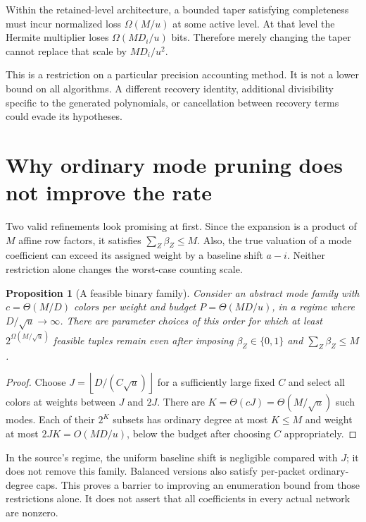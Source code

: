 \documentclass[11pt,letterpaper]{article}
\numberwithin{equation}{section}
\newtheorem{proposition}[theorem]{Proposition}
\theoremstyle{definition}
\theoremstyle{remark}
\newcommand{\floor}[1]{\left\lfloor #1\right\rfloor}
\begin{document}
Within the retained-level architecture, a bounded taper satisfying
completeness must incur normalized loss $\Omega(M/u)$ at some active
level. At that level the Hermite multiplier loses
$\Omega(MD_i/u)$ bits. Therefore merely changing the taper cannot replace
that scale by $MD_i/u^2$.

This is a restriction on a particular precision accounting method. It is
not a lower bound on all algorithms. A different recovery identity,
additional divisibility specific to the generated polynomials, or
cancellation between recovery terms could evade its hypotheses.

\section{Why ordinary mode pruning does not improve the rate}
\label{sec:barriers}

Two valid refinements look promising at first. Since the expansion is a
product of $M$ affine row factors, it satisfies $\sum_Z\beta_Z\le M$.
Also, the true valuation of a mode coefficient can exceed its assigned
weight by a baseline shift $a-i$. Neither restriction alone changes
the worst-case counting scale.

\begin{proposition}[A feasible binary family]
\label{prop:mode-family}
Consider an abstract mode family with $c=\Theta(M/D)$ colors per weight
and budget $P=\Theta(MD/u)$, in a regime where
$D/\sqrt u\to\infty$. There are parameter choices of this order for which
at least $2^{\Omega(M/\sqrt u)}$ feasible tuples remain even after imposing
$\beta_Z\in\{0,1\}$ and $\sum_Z\beta_Z\le M$.
\end{proposition}
\begin{proof}
Choose $J=\floor{D/(C\sqrt u)}$ for a sufficiently large fixed $C$ and
select all colors at weights between $J$ and $2J$. There are
$K=\Theta(cJ)=\Theta(M/\sqrt u)$ such modes. Each of their $2^K$ subsets
has ordinary degree at most $K\le M$ and weight at most
$2JK=O(MD/u)$, below the budget after choosing $C$ appropriately.
\end{proof}

In the source's regime, the uniform baseline shift is negligible compared
with $J$; it does not remove this family. Balanced versions also satisfy
per-packet ordinary-degree caps. This proves a barrier to improving an
enumeration bound from those restrictions alone. It does not assert that
all coefficients in every actual network are nonzero.
\end{document}

